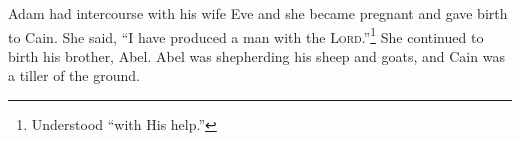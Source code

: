 
\begin{inparaenum}
     Adam had intercourse with his wife Eve and she became pregnant and gave birth to Cain. She said, ``I have produced a man with the \textsc{Lord}.''\footnote{Understood ``with His help.''}%
     She continued to birth his brother, Abel. Abel was shepherding his sheep and goats, and Cain was a tiller of the ground.%
    
    
    
\end{inparaenum}
